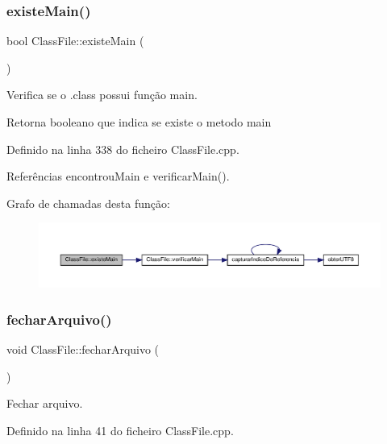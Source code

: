\subsubsection{\texorpdfstring{existe\+Main()}{existeMain()}}
{\footnotesize\ttfamily bool Class\+File\+::existe\+Main (\begin{DoxyParamCaption}{ }\end{DoxyParamCaption})}



Verifica se o .class possui função main. 

\begin{DoxyReturn}{Retorna}
booleano que indica se existe o metodo main 
\end{DoxyReturn}


Definido na linha 338 do ficheiro Class\+File.\+cpp.



Referências encontrou\+Main e verificar\+Main().

Grafo de chamadas desta função\+:
\nopagebreak
\begin{figure}[H]
\begin{center}
\leavevmode
\includegraphics[width=350pt]{classClassFile_a10bfe22492b473fb0197e55f451978e5_cgraph}
\end{center}
\end{figure}
\mbox{\label{classClassFile_a581c453009afcb8b7a2861a2de8cfb5c}} 
\subsubsection{\texorpdfstring{fechar\+Arquivo()}{fecharArquivo()}}
{\footnotesize\ttfamily void Class\+File\+::fechar\+Arquivo (\begin{DoxyParamCaption}{ }\end{DoxyParamCaption})}



Fechar arquivo. 



Definido na linha 41 do ficheiro Class\+File.\+cpp.




